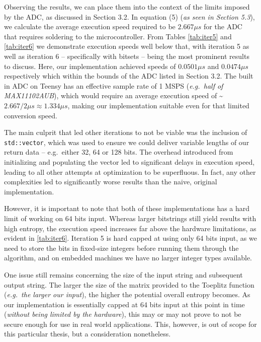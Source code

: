 Observing the results, we can place them into the context of the limits imposed by the ADC, as discussed in Section 3.2. In equation (5) (\emph{as seen in Section 5.3}), we calculate the average execution speed required to be \(2.667 \mu s\) for the ADC that requires soldering to the microcontroller. From Tables \ref{tab:iter5} and \ref{tab:iter6} we demonstrate execution speeds well below that, with iteration 5 as well as iteration 6 -- specifically with bitsets -- being the most prominent results to discuss. Here, our implementation achieved speeds of \(0.0501 \mu s\) and \(0.0474 \mu s\) respectively which within the bounds of the ADC listed in Section 3.2. The built in ADC on Teensy has an effective sample rate of 1 MSPS (\emph{e.g.~half of MAX11102AUB}), which would require an average execution speed of \textasciitilde{}\(2.667/2 \mu s \approx 1.334 \mu s\), making our implementation suitable even for that limited conversion speed.

The main culprit that led other iterations to not be viable was the inclusion of \texttt{std::vector}, which was used to ensure we could deliver variable lengths of our return data -- e.g.~either 32, 64 or 128 bits. The overhead introduced from initializing and populating the vector led to significant delays in execution speed, leading to all other attempts at optimization to be superfluous. In fact, any other complexities led to significantly worse results than the naive, original implementation.

However, it is important to note that both of these implementations has a hard limit of working on 64 bits input. Whereas larger bitstrings still yield results with high entropy, the execution speed increases far above the hardware limitations, as evident in \ref{tab:iter6}. Iteration 5 is hard capped at using only 64 bits input, as we need to store the bits in fixed-size integers before running them through the algorithm, and on embedded machines we have no larger integer types available.

One issue still remains concerning the size of the input string and subsequent output string. The larger the size of the matrix provided to the Toeplitz function (\emph{e.g.~the larger our input}), the higher the potential overall entropy becomes. As our implementation is essentially capped at 64 bits input at this point in time (\emph{without being limited by the hardware}), this may or may not prove to not be secure enough for use in real world applications. This, however, is out of scope for this particular thesis, but a consideration nonetheless.

